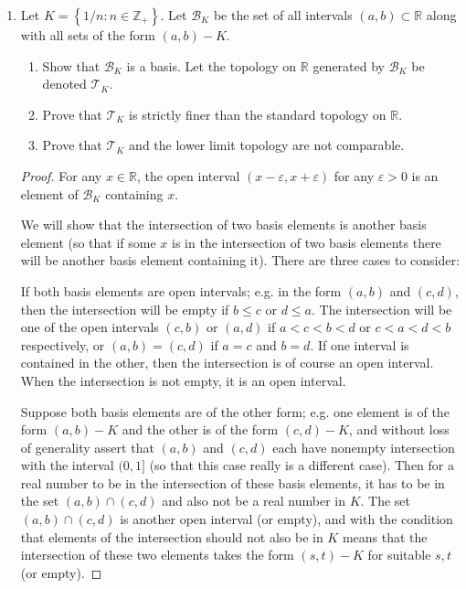 \documentclass[11pt]{article}
\newcommand{\cbr}[1]{\left\{#1\right\}}
\begin{document}
\begin{enumerate}
\begin{proof}
      Thus both topologies are the same.
    \end{proof}
    \item Let $K = \cbr{1/n\colon n\in\mathbb{Z}_+}$. Let $\mathcal{B}_K$ be the set of all intervals $(a,b)\subset \mathbb{R}$ along with all sets of the form $(a,b)-K$. \begin{enumerate}[label=(\alph*)]
      \item Show that $\mathcal{B}_K$ is a basis. Let the topology on $\mathbb{R}$ generated by $\mathcal{B}_K$ be denoted $\mathcal{T}_K$.
      \item Prove that $\mathcal{T}_K$ is strictly finer than the standard topology on $\mathbb{R}$.
      \item Prove that $\mathcal{T}_K$ and the lower limit topology are not comparable.
    \end{enumerate}
    \begin{proof}
      For any $x\in\mathbb{R}$, the open interval $(x-\varepsilon, x+\varepsilon)$ for any $\varepsilon>0$ is an element of $\mathcal{B}_K$ containing $x$.

      We will show that the intersection of two basis elements is another basis element (so that if some $x$ is in the intersection of two basis elements there will be another basis element containing it). There are three cases to consider:

      If both basis elements are open intervals; e.g. in the form $(a,b)$ and $(c,d)$, then the intersection will be empty if $b \leq c$ or $d \leq a$. The intersection will be one of the open intervals $(c,b)$ or $(a,d)$ if $a<c<b<d$ or $c<a<d<b$ respectively, or $(a,b) = (c,d)$ if $a = c$ and $b = d$. If one interval is contained in the other, then the intersection is of course an open interval. When the intersection is not empty, it is an open interval.

      Suppose both basis elements are of the other form; e.g. one element is of the form $(a,b)-K$ and the other is of the form $(c,d)-K$, and without loss of generality assert that $(a,b)$ and $(c,d)$ each have nonempty intersection with the interval $(0,1]$ (so that this case really is a different case). Then for a real number to be in the intersection of these basis elements, it has to be in the set $(a,b)\cap (c,d)$ and also not be a real number in $K$. The set $(a,b)\cap (c,d)$ is another open interval (or empty), and with the condition that elements of the intersection should not also be in $K$ means that the intersection of these two elements takes the form $(s,t)-K$ for suitable $s,t$ (or empty).


\end{proof}
\end{enumerate}
\end{document}

